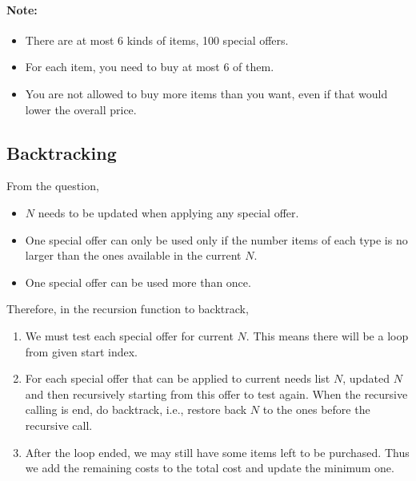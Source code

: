 \paragraph{Note:}

\begin{itemize}
\item There are at most 6 kinds of items, 100 special offers.
\item For each item, you need to buy at most 6 of them.
\item You are not allowed to buy more items than you want, even if that would lower the overall price.
\end{itemize}

\subsection{Backtracking}
From the question, 
\begin{itemize}
\item $N$ needs to be updated when applying any special offer.
\item One special offer can only be used only if the number items of each type is no larger than the ones available in the current $N$.
\item One special offer can be used more than once.
\end{itemize}

Therefore, in the recursion function to backtrack, 
\begin{enumerate}
\item We must test each special offer for current $N$. This means there will be a loop from given start index.
\item For each special offer that can be applied to current needs list $N$, updated $N$ and then recursively starting from this offer to test again. When the recursive calling is end, do backtrack, i.e., restore back $N$ to the ones before the recursive call.
\item After the loop ended, we may still have some items left to be purchased. Thus we add the remaining costs to the total cost and update the minimum one.
\end{enumerate}
